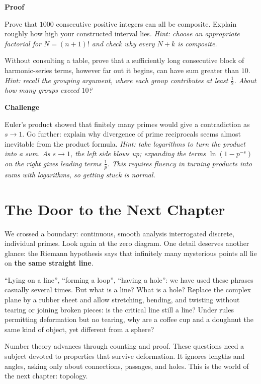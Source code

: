 \textbf{Proof}
\begin{sikao}
  \item Prove that $1000$ consecutive positive integers can all be composite. Explain roughly how high your constructed interval lies. \emph{Hint: choose an appropriate factorial for $N=(n+1)!$ and check why every $N+k$ is composite.}
  \item Without consulting a table, prove that a sufficiently long consecutive block of harmonic-series terms, however far out it begins, can have sum greater than $10$. \emph{Hint: recall the grouping argument, where each group contributes at least $\frac12$. About how many groups exceed $10$?}
\end{sikao}

\textbf{Challenge}
\begin{sikao}
  \item Euler's product showed that finitely many primes would give a contradiction as $s\to1$. Go further: explain why divergence of prime reciprocals seems almost inevitable from the product formula. \emph{Hint: take logarithms to turn the product into a sum. As $s\to1$, the left side blows up; expanding the terms $\ln(1-p^{-s})$ on the right gives leading terms $\frac1p$. This requires fluency in turning products into sums with logarithms, so getting stuck is normal.}
\end{sikao}

\section*{The Door to the Next Chapter}

We crossed a boundary: continuous, smooth analysis interrogated discrete, individual primes. Look again at the zero diagram. One detail deserves another glance: the Riemann hypothesis says that infinitely many mysterious points all lie on \textbf{the same straight line}.

``Lying on a line'', ``forming a loop'', ``having a hole'': we have used these phrases casually several times. But what is a line? What is a hole? Replace the complex plane by a rubber sheet and allow stretching, bending, and twisting without tearing or joining broken pieces: is the critical line still a line? Under rules permitting deformation but no tearing, why are a coffee cup and a doughnut the same kind of object, yet different from a sphere?

Number theory advances through counting and proof. These questions need a subject devoted to properties that survive deformation. It ignores lengths and angles, asking only about connections, passages, and holes. This is the world of the next chapter: topology.
